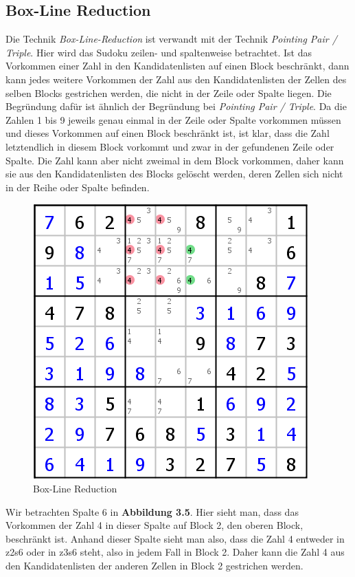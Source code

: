 \newpage
\subsection{Box-Line Reduction}
Die Technik \textit{Box-Line-Reduction} ist verwandt mit der Technik \textit{Pointing Pair / Triple}. Hier wird das Sudoku zeilen- und spaltenweise betrachtet. Ist das Vorkommen einer Zahl in den Kandidatenlisten auf einen Block beschränkt, dann kann jedes weitere Vorkommen der Zahl aus den Kandidatenlisten der Zellen des selben Blocks gestrichen werden, die nicht in der Zeile oder Spalte liegen. Die Begründung dafür ist ähnlich der Begründung bei \textit{Pointing Pair / Triple}. Da die Zahlen 1 bis 9 jeweils genau einmal in der Zeile oder Spalte vorkommen müssen und dieses Vorkommen auf einen Block beschränkt ist, ist klar, dass die Zahl letztendlich in diesem Block vorkommt und zwar in der gefundenen Zeile oder Spalte. Die Zahl kann aber nicht zweimal in dem Block vorkommen, daher kann sie aus den Kandidatenlisten des Blocks gelöscht werden, deren Zellen sich nicht in der Reihe oder Spalte befinden.

\begin{figure}[h]
\begin{center}
\includegraphics{./img/box_line_reduction.png}
\caption{Box-Line Reduction}
\end{center}
\end{figure}

Wir betrachten Spalte 6 in \textbf{Abbildung 3.5}. Hier sieht man, dass das Vorkommen der Zahl 4 in dieser Spalte auf Block 2, den oberen Block, beschränkt ist. Anhand dieser Spalte sieht man also, dass die Zahl 4 entweder in z2s6 oder in z3s6 steht, also in jedem Fall in Block 2. Daher kann die Zahl 4 aus den Kandidatenlisten der anderen Zellen in Block 2 gestrichen werden.
